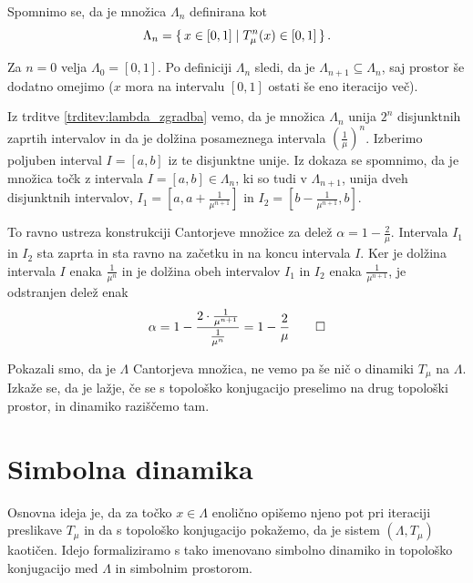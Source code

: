 \documentclass{isrmdelo}
\begin{document}
\begin{dokaz}
Spomnimo se, da je množica $\Lambda_n$ definirana kot
\begin{equation*}
\Lambda_{n} = \set{ x \in [0,1] \mid T_\mu^n(x) \in [0,1] }.
\end{equation*}

Za $n = 0$ velja $\Lambda_0 = [0,1]$. Po definiciji $\Lambda_n$ sledi, da je $\Lambda_{n+1} \subseteq \Lambda_n$, saj prostor še dodatno omejimo ($x$ mora na intervalu $[0,1]$ ostati še eno iteracijo več).

\medskip

Iz trditve \ref{trditev:lambda_zgradba} vemo, da je množica $\Lambda_n$ unija $2^n$ disjunktnih zaprtih intervalov in da je dolžina posameznega intervala $(\frac{1}{\mu})^n$. Izberimo poljuben interval $I = [a,b]$ iz te disjunktne unije. Iz dokaza se spomnimo, da je množica točk z intervala $I = [a,b] \in \Lambda_n$, ki so tudi v $\Lambda_{n+1}$, unija dveh disjunktnih intervalov, $I_1 = [a, a+\frac{1}{\mu^{n+1}}]$ in $I_2 = [b-\frac{1}{\mu^{n+1}}, b]$.

To ravno ustreza konstrukciji Cantorjeve množice za delež $\alpha = 1 - \frac{2}{\mu}$. Intervala $I_1$ in $I_2$ sta zaprta in sta ravno na začetku in na koncu intervala $I$. Ker je dolžina intervala $I$ enaka $\frac{1}{\mu^n}$ in je dolžina obeh intervalov $I_1$ in $I_2$ enaka $\frac{1}{\mu^{n+1}}$, je odstranjen delež enak
\begin{equation*}
\alpha = 1 - \frac{2 \cdot \frac{1}{\mu^{n+1}}}{\frac{1}{\mu^n}} = 1 - \frac{2}{\mu} \qedhere
\end{equation*}
\end{dokaz}

\bigskip

Pokazali smo, da je $\Lambda$ Cantorjeva množica, ne vemo pa še nič o dinamiki $T_\mu$ na $\Lambda$. Izkaže se, da je lažje, če se s topološko konjugacijo preselimo na drug topološki prostor, in dinamiko raziščemo tam.

\section{Simbolna dinamika}

Osnovna ideja je, da za točko $x \in \Lambda$ enolično opišemo njeno pot pri iteraciji preslikave $T_\mu$ in da s topološko konjugacijo pokažemo, da je sistem $(\Lambda, T_\mu)$ kaotičen. Idejo formaliziramo s tako imenovano simbolno dinamiko in topološko konjugacijo med $\Lambda$ in simbolnim prostorom.
\end{document}
